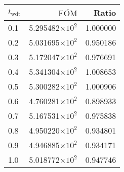 \begin{tabular}{lrr}
\toprule
$t_{\mathrm{wdt}}$ & $\overline{\mathrm{FOM}}$ &    Ratio \\
\midrule
               0.1 &   5.295482$\times 10^{2}$ & 1.000000 \\
               0.2 &   5.031695$\times 10^{2}$ & 0.950186 \\
               0.3 &   5.172047$\times 10^{2}$ & 0.976691 \\
               0.4 &   5.341304$\times 10^{2}$ & 1.008653 \\
               0.5 &   5.300282$\times 10^{2}$ & 1.000906 \\
               0.6 &   4.760281$\times 10^{2}$ & 0.898933 \\
               0.7 &   5.167531$\times 10^{2}$ & 0.975838 \\
               0.8 &   4.950220$\times 10^{2}$ & 0.934801 \\
               0.9 &   4.946885$\times 10^{2}$ & 0.934171 \\
               1.0 &   5.018772$\times 10^{2}$ & 0.947746 \\
\bottomrule
\end{tabular}
